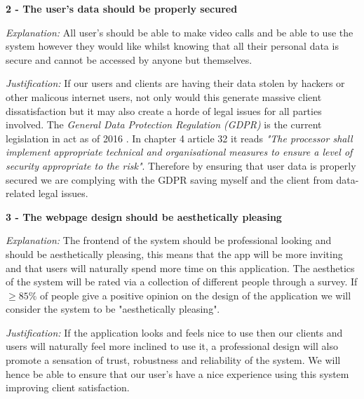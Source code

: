 \vspace{0.2cm}

\textsf{\bfseries 2 - The user's data should be properly secured} 

\vspace{0.1cm}

\textit{Explanation:} 
All user's should be able to make video calls and be able to 
use the system however they would like whilst knowing that all
their personal data is secure and cannot be accessed by anyone
but themselves.

\vspace{0.1cm}

\textit{Justification:}
If our users and clients are having their data stolen by
hackers or other malicous internet users, not only would this 
generate massive client dissatisfaction but it may also create
a horde of legal issues for all parties involved. The 
\textit{General Data Protection Regulation (GDPR)} is the
current legislation in act as of 2016 \cite{gdpr}. In chapter 4 
article 32 it reads \textit{"The processor shall implement
appropriate technical and organisational measures to ensure
a level of security appropriate to the risk"}. Therefore by 
ensuring that user data is properly secured we are complying 
with the GDPR saving myself and the client from data-related
legal issues.

\vspace{0.2cm}

\textsf{\bfseries 3 - The webpage design should be aesthetically
pleasing}

\vspace{0.1cm}

\textit{Explanation:} 
The frontend of the system should be professional looking and
should be aesthetically pleasing, this means that the app
will be more inviting and that users will naturally spend more
time on this application. The aesthetics of the system will be
rated via a collection of different people through a survey.
If $\geq 85\%$ of people give a positive opinion on the 
design of the application we will consider the system to be 
"aesthetically pleasing".

\vspace{0.1cm}

\textit{Justification:}
If the application looks and feels nice to use then our 
clients and users will naturally feel more inclined to use it,
a professional design will also promote a sensation of trust,
robustness and reliability of the system. We will hence be
able to ensure that our user's have a nice experience using 
this system improving client satisfaction.

